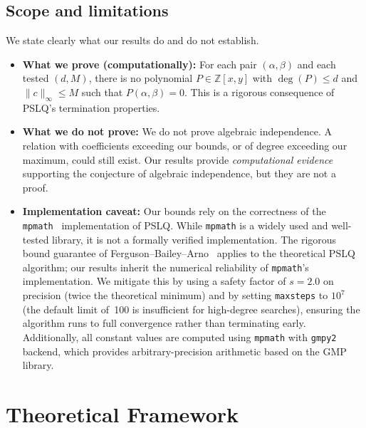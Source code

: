 \documentclass[11pt]{amsart}
\theoremstyle{remark}
\newcommand{\Z}{\mathbb{Z}}
\newcommand{\norm}[1]{\lVert #1 \rVert}
\begin{document}
\subsection{Scope and limitations}\label{ssec:scope}

We state clearly what our results do and do not establish.

\begin{itemize}
\item \textbf{What we prove (computationally):} For each pair $(\alpha,\beta)$ and
  each tested $(d,M)$, there is no polynomial $P\in\Z[x,y]$ with $\deg(P)\le d$ and
  $\norm{c}_\infty\le M$ such that $P(\alpha,\beta)=0$. This is a rigorous
  consequence of PSLQ's termination properties.

\item \textbf{What we do not prove:} We do not prove algebraic independence. A
  relation with coefficients exceeding our bounds, or of degree exceeding our
  maximum, could still exist. Our results provide \emph{computational evidence}
  supporting the conjecture of algebraic independence, but they are not a proof.

\item \textbf{Implementation caveat:} Our bounds rely on the correctness of the
  \texttt{mpmath}~\cite{mpmath} implementation of PSLQ. While \texttt{mpmath} is a
  widely used and well-tested library, it is not a formally verified implementation.
  The rigorous bound guarantee of Ferguson--Bailey--Arno~\cite{FergusonBaileyArno1999}
  applies to the theoretical PSLQ algorithm; our results inherit the numerical
  reliability of \texttt{mpmath}'s implementation. We mitigate this by using a safety
  factor of $s=2.0$ on precision (twice the theoretical minimum) and by setting
  \texttt{maxsteps} to $10^7$ (the default limit of~100 is insufficient for
  high-degree searches), ensuring the algorithm runs to full convergence rather
  than terminating early. Additionally, all constant values are
  computed using \texttt{mpmath} with \texttt{gmpy2} backend, which provides
  arbitrary-precision arithmetic based on the GMP library.
\end{itemize}

\section{Theoretical Framework}\label{sec:theory}
\end{document}

